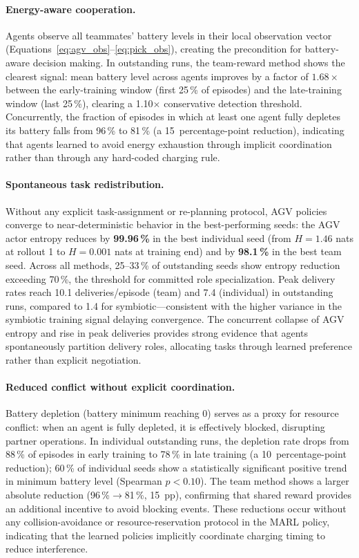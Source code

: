 \documentclass[Afour,sageh,times]{sagej}
\begin{document}
\paragraph{Energy-aware cooperation.}
Agents observe all teammates' battery levels in their local observation vector (Equations~\ref{eq:agv_obs}--\ref{eq:pick_obs}), creating the precondition for battery-aware decision making. In outstanding runs, the team-reward method shows the clearest signal: mean battery level across agents improves by a factor of $\mathbf{1.68\times}$ between the early-training window (first 25\,\% of episodes) and the late-training window (last 25\,\%), clearing a 1.10$\times$ conservative detection threshold. Concurrently, the fraction of episodes in which at least one agent fully depletes its battery falls from 96\,\% to 81\,\% (a 15~percentage-point reduction), indicating that agents learned to avoid energy exhaustion through implicit coordination rather than through any hard-coded charging rule.

\paragraph{Spontaneous task redistribution.}
Without any explicit task-assignment or re-planning protocol, AGV policies converge to near-deterministic behavior in the best-performing seeds: the AGV actor entropy reduces by \textbf{99.96\,\%} in the best individual seed (from $H = 1.46$ nats at rollout 1 to $H = 0.001$ nats at training end) and by \textbf{98.1\,\%} in the best team seed. Across all methods, 25--33\,\% of outstanding seeds show entropy reduction exceeding 70\,\%, the threshold for committed role specialization. Peak delivery rates reach 10.1 deliveries/episode (team) and 7.4 (individual) in outstanding runs, compared to 1.4 for symbiotic---consistent with the higher variance in the symbiotic training signal delaying convergence. The concurrent collapse of AGV entropy and rise in peak deliveries provides strong evidence that agents spontaneously partition delivery roles, allocating tasks through learned preference rather than explicit negotiation.

\paragraph{Reduced conflict without explicit coordination.}
Battery depletion (battery minimum reaching 0) serves as a proxy for resource conflict: when an agent is fully depleted, it is effectively blocked, disrupting partner operations. In individual outstanding runs, the depletion rate drops from 88\,\% of episodes in early training to 78\,\% in late training (a 10~percentage-point reduction); 60\,\% of individual seeds show a statistically significant positive trend in minimum battery level (Spearman $p < 0.10$). The team method shows a larger absolute reduction (96\,\%$\to$81\,\%, 15~pp), confirming that shared reward provides an additional incentive to avoid blocking events. These reductions occur without any collision-avoidance or resource-reservation protocol in the MARL policy, indicating that the learned policies implicitly coordinate charging timing to reduce interference.
\end{document}
